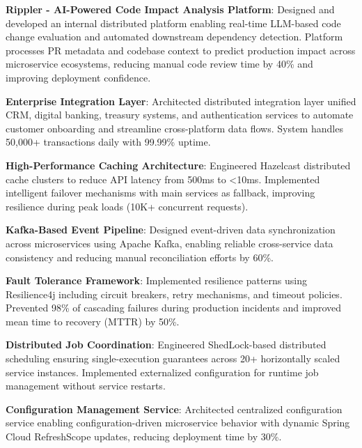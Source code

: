 \documentclass[]{hanisntsolo-resume}
\begin{document}
\begin{tightemize}
\item \textbf{Rippler - AI-Powered Code Impact Analysis Platform}: Designed and developed an internal distributed platform enabling real-time LLM-based code change evaluation and automated downstream dependency detection. Platform processes PR metadata and codebase context to predict production impact across microservice ecosystems, reducing manual code review time by 40\% and improving deployment confidence.

\item \textbf{Enterprise Integration Layer}: Architected distributed integration layer unified CRM, digital banking, treasury systems, and authentication services to automate customer onboarding and streamline cross-platform data flows. System handles 50,000+ transactions daily with 99.99\% uptime.

\item \textbf{High-Performance Caching Architecture}: Engineered Hazelcast distributed cache clusters to reduce API latency from 500ms to <10ms. Implemented intelligent failover mechanisms with main services as fallback, improving resilience during peak loads (10K+ concurrent requests).

\item \textbf{Kafka-Based Event Pipeline}: Designed event-driven data synchronization across microservices using Apache Kafka, enabling reliable cross-service data consistency and reducing manual reconciliation efforts by 60\%.

\item \textbf{Fault Tolerance Framework}: Implemented resilience patterns using Resilience4j including circuit breakers, retry mechanisms, and timeout policies. Prevented 98\% of cascading failures during production incidents and improved mean time to recovery (MTTR) by 50\%.

\item \textbf{Distributed Job Coordination}: Engineered ShedLock-based distributed scheduling ensuring single-execution guarantees across 20+ horizontally scaled service instances. Implemented externalized configuration for runtime job management without service restarts.

\item \textbf{Configuration Management Service}: Architected centralized configuration service enabling configuration-driven microservice behavior with dynamic Spring Cloud RefreshScope updates, reducing deployment time by 30\%.


\end{tightemize}
\end{document}
